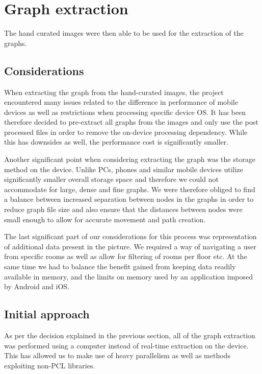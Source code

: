\documentclass[main.tex]{subfiles}
\begin{document}
\section{Graph extraction}

The hand curated images were then able to be used for the extraction of the graphs.

\subsection{Considerations}

When extracting the graph from the hand-curated images, the project encountered many issues related to the difference in performance of mobile devices as well as restrictions when processing specific device OS. It has been therefore decided to pre-extract all graphs from the images and only use the post processed files in order to remove the on-device processing dependency. While this has downsides as well, the performance cost is significantly smaller.
\newline
		
Another significant point when considering extracting the graph was the storage method on the device. Unlike PCs, phones and similar mobile devices utilize significantly smaller overall storage space and therefore we could not accommodate for large, dense and fine graphs. We were therefore obliged to find a balance between increased separation between nodes in the graphs in order to reduce graph file size and also ensure that the distances between nodes were small enough to allow for accurate movement and path creation.
\newline
	
The last significant part of our considerations for this process was representation of additional data present in the picture. We required a way of navigating a user from specific rooms as well as allow for filtering of rooms per floor etc. At the same time we had to balance the benefit gained from keeping data readily available in memory, and the limits on memory used by an application imposed by Android and iOS.

\subsection{Initial approach}

As per the decision explained in the previous section, all of the graph extraction was performed using a computer instead of real-time extraction on the device. This has allowed us to make use of heavy parallelism as well as methods exploiting non-PCL libraries.
\newline
	
\end{document}
